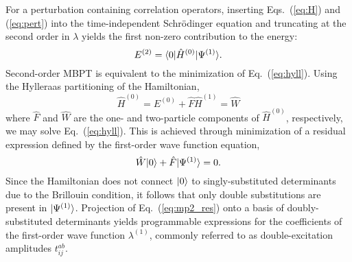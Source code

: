 For a perturbation containing correlation operators, inserting
Eqs.~(\ref{eq:H}) and (\ref{eq:pert}) into the time-independent Schr\"odinger
equation and truncating at the second order in $\lambda$ yields the first
non-zero contribution to the energy:\cite{Szabo1996} \begin{equation}
\label{eq:hyll}
    E^{(2)} = \langle0 |\hat{H}^{(0)}| \Psi^{(1)} \rangle.
\end{equation} Second-order MBPT is equivalent to the minimization
of Eq.~(\ref{eq:hyll}). Using the Hylleraas partitioning of the
Hamiltonian,\cite{Pulay1986b} \begin{subequations}
    \begin{equation}
        \hat{H}^{(0)} = E^{(0)} + \hat{F}
    \end{equation} \begin{equation}
        \hat{H}^{(1)} = \hat{W}
    \end{equation}
\end{subequations} where $\hat{F}$ and $\hat{W}$ are the one- and
two-particle components of $\hat{H}^{(0)}$, respectively, we may solve Eq.~(\ref{eq:hyll}).
This is achieved
through minimization of a residual expression defined by the first-order
wave function equation, 
\begin{equation} \label{eq:mp2_res}
    \hat{W}| 0 \rangle + \hat{F}| \Psi^{(1)} \rangle = 0.
\end{equation} Since the Hamiltonian does not connect
$| 0 \rangle$ to singly-substituted determinants due to the Brillouin
condition,\cite{Szabo1996} it follows that only double substitutions are
present in $| \Psi^{(1)} \rangle$. Projection of Eq.~(\ref{eq:mp2_res}) onto a
basis of doubly-substituted determinants yields programmable expressions
for the coefficients of the first-order wave function $\lambda^{(1)}$,
commonly referred to as double-excitation amplitudes $t^{ab}_{ij}$.


